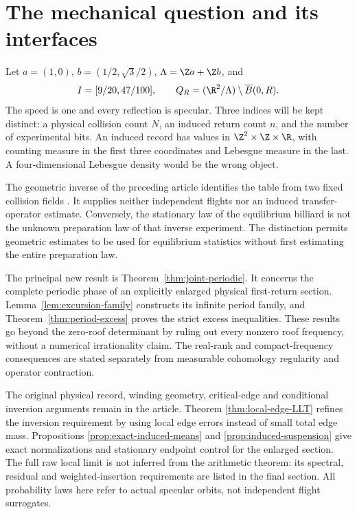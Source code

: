 \section{The mechanical question and its interfaces}
Let $a=(1,0)$, $b=(1/2,\sqrt3/2)$, $\Lambda=\Z a+\Z b$, and
\[
 I=[9/20,47/100],\qquad Q_R=(\R^2/\Lambda)\setminus\overline B(0,R).
\]
The speed is one and every reflection is specular. Three indices will be kept distinct: a physical collision count $N$, an induced return count $n$, and the number of experimental bits. An induced record has values in $\Z^2\times\Z\times\R$, with counting measure in the first three coordinates and Lebesgue measure in the last. A four-dimensional Lebesgue density would be the wrong object.

The geometric inverse of the preceding article identifies the table from two fixed collision fields \cite{A2G}. It supplies neither independent flights nor an induced transfer-operator estimate. Conversely, the stationary law of the equilibrium billiard is not the unknown preparation law of that inverse experiment. The distinction permits geometric estimates to be used for equilibrium statistics without first estimating the entire preparation law.

The principal new result is Theorem~\ref{thm:joint-periodic}. It concerns
the complete periodic phase of an explicitly enlarged physical first-return
section. Lemma~\ref{lem:excursion-family} constructs its infinite period
family, and Theorem~\ref{thm:period-excess} proves the strict excess
inequalities. These results go beyond the zero-roof determinant by ruling
out every nonzero roof frequency, without a numerical irrationality claim.
The real-rank and compact-frequency consequences are stated separately
from measurable cohomology regularity and operator contraction.

The original physical record, winding geometry, critical-edge and
conditional inversion arguments remain in the article. Theorem
\ref{thm:local-edge-LLT} refines the inversion requirement by using local
edge errors instead of small total edge mass. Propositions
\ref{prop:exact-induced-means} and \ref{prop:induced-suspension} give exact
normalizations and stationary endpoint control for the enlarged section.
The full raw local limit is not inferred from the arithmetic theorem:
its spectral, residual and weighted-insertion requirements are listed in
the final section. All probability laws here refer to actual specular
orbits, not independent flight surrogates.

